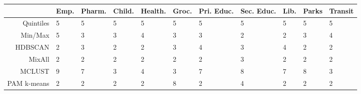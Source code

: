\documentclass[11pt, a4paper]{article}
\begin{document}
\pagestyle{empty}








\begin{table}[ht]
\centering
\begin{tabular}{rllllllllll}
  \hline
 & Emp. & Pharm. & Child. & Health. & Groc. & Pri. Educ. & Sec. Educ. & Lib. & Parks & Transit \\ 
  \hline
Quintiles & 5 & 5 & 5 & 5 & 5 & 5 & 5 & 5 & 5 & 5 \\ 
  Min/Max & 5 & 3 & 3 & 4 & 3 & 3 & 2 & 2 & 3 & 4 \\ 
  HDBSCAN & 2 & 3 & 2 & 2 & 3 & 4 & 3 & 4 & 2 & 2 \\ 
  MixAll & 2 & 2 & 2 & 2 & 2 & 2 & 3 & 2 & 2 & 2 \\ 
  MCLUST & 9 & 7 & 3 & 4 & 3 & 7 & 8 & 7 & 8 & 3 \\ 
  PAM k-means & 2 & 2 & 2 & 2 & 8 & 2 & 4 & 2 & 2 & 2 \\ 
   \hline
\end{tabular}
\end{table}
\end{document}
